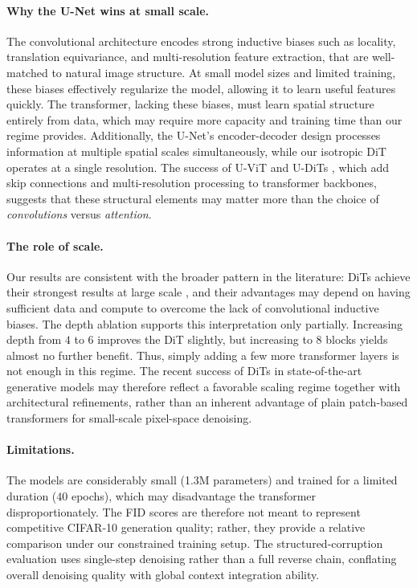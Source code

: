 \documentclass{article}
\begin{document}
\paragraph{Why the U-Net wins at small scale.}
The convolutional architecture encodes strong inductive biases such as locality, translation equivariance, and multi-resolution feature extraction, that are well-matched to natural image structure.
At small model sizes and limited training, these biases effectively regularize the model, allowing it to learn useful features quickly.
The transformer, lacking these biases, must learn spatial structure entirely from data, which may require more capacity and training time than our regime provides.
Additionally, the U-Net's encoder-decoder design processes information at multiple spatial scales simultaneously, while our isotropic DiT operates at a single resolution.
The success of U-ViT \citep{bao2023uvit} and U-DiTs \citep{tian2024udit}, which add skip connections and multi-resolution processing to transformer backbones, suggests that these structural elements may matter more than the choice of \textit{convolutions} versus \textit{attention}.

\paragraph{The role of scale.}
Our results are consistent with the broader pattern in the literature: DiTs achieve their strongest results at large scale \citep{peebles2023dit}, and their advantages may depend on having sufficient data and compute to overcome the lack of convolutional inductive biases.
The depth ablation supports this interpretation only partially.
Increasing depth from $4$ to $6$ improves the DiT slightly, but increasing to $8$ blocks yields almost no further benefit.
Thus, simply adding a few more transformer layers is not enough in this regime.
The recent success of DiTs in state-of-the-art generative models may therefore reflect a favorable scaling regime together with architectural refinements, rather than an inherent advantage of plain patch-based transformers for small-scale pixel-space denoising.

\paragraph{Limitations.}
The models are considerably small (1.3M parameters) and trained for a limited duration ($40$ epochs), which may disadvantage the transformer disproportionately.
The FID scores are therefore not meant to represent competitive CIFAR-10 generation quality; rather, they provide a relative comparison under our constrained training setup.
The structured-corruption evaluation uses single-step denoising rather than a full reverse chain, conflating overall denoising quality with global context integration ability.
\end{document}
